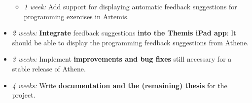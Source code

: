 \begin{itemize}
\begin{itemize}
        \item \textit{1 week:} Add support for displaying automatic feedback suggestions for programming exercises in Artemis.
    \end{itemize}
    \item \textit{2 weeks:} \textbf{Integrate} feedback suggestions \textbf{into the Themis iPad app}: It should be able to display the programming feedback suggestions from Athene.
    \item \textit{3 weeks:} Implement \textbf{improvements and bug fixes} still necessary for a stable release of Athene.
    \item \textit{4 weeks:} Write \textbf{documentation and the (remaining) thesis} for the project.
\end{itemize}


\clearpage

\clearpage




